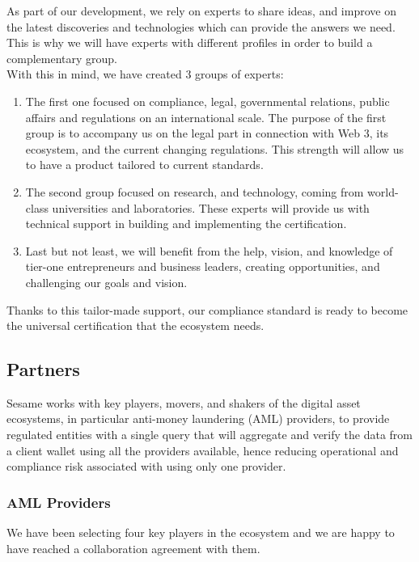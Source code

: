 ﻿\documentclass[a4paper]{article}
\begin{document}
As part of our development, we rely on experts to share ideas, and improve on the latest discoveries and technologies which can provide the answers we need. This is why we will have experts with different profiles in order to build a complementary group. \\

With this in mind, we have created 3 groups of experts: 

\begin{enumerate}
\item The first one focused on compliance, legal, governmental relations, public affairs and regulations on an international scale. 
The purpose of the first group is to accompany us on the legal part in connection with Web 3, its ecosystem, and the current changing regulations. This strength will allow us to have a product tailored to current standards.

\item The second group focused on research, and technology, coming from world-class universities and laboratories. These experts will provide us with technical support in building and implementing the certification.

\item Last but not least, we will benefit from the help, vision, and knowledge of tier-one entrepreneurs and business leaders, creating opportunities, and challenging our goals and vision.
\end{enumerate}

Thanks to this tailor-made support, our compliance standard is ready to become the universal certification that the ecosystem needs.

\subsection{Partners}
Sesame works with key players, movers, and shakers of the digital asset ecosystems, in particular anti-money laundering (AML) providers, to provide regulated entities with a single query that will aggregate and verify the data from a client wallet using all the providers available, hence reducing operational and compliance risk associated with using only one provider.


\subsubsection{AML Providers}
We have been selecting four key players in the ecosystem and we are happy to have reached a collaboration agreement with them. 
\end{document}
